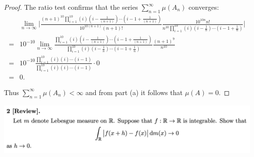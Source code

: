 \begin{enumerate}[label=(\alph*)]
\begin{proof}
  The ratio test confirms that the series $\sum_{n=1}^\infty \mu(A_n)$ converges:
  \begin{align*}
    &\lim_{n\to\infty} \Bigg|\frac{(n+1)^{10}\prod_{i=1}^{10} (i)(i -\frac{1}{(n+1)} )\cdots(i - 1 +\frac{1}{(n+1)} )}{10^{10(n+1)}(n+1)!}     \frac{10^{10n}n!}{n^{10}\prod_{i=1}^{10} (i)(i -\frac{1}{n} )\cdots(i - 1 +\frac{1}{n} )}\Bigg| \\
    = &10^{-10}\lim_{n\to\infty} \frac{\prod_{i=1}^{10} (i)(i -\frac{1}{(n+1)} )\cdots(i - 1 +\frac{1}{(n+1)} )}{\prod_{i=1}^{10} (i)(i -\frac{1}{n} )\cdots(i - 1 +\frac{1}{n} )}     \frac{(n+1)^{9}}{n^{10}} \\
    = &10^{-10}\frac{\prod_{i=1}^{10} (i)(i )\cdots(i - 1  )}{\prod_{i=1}^{10} (i)(i )\cdots(i - 1 )}   \cdot  0 \\
    = &0.
  \end{align*}

  Thus $\sum_{n=1}^\infty \mu(A_n) < \infty$ and from part (a) it follows that $\mu(A) = 0$.
\end{proof}
\end{enumerate}

\newpage
\begin{mdframed}
\includegraphics[width=400pt]{img/analysis--berkeley-202a-hw10-5e9e.png}
\end{mdframed}


